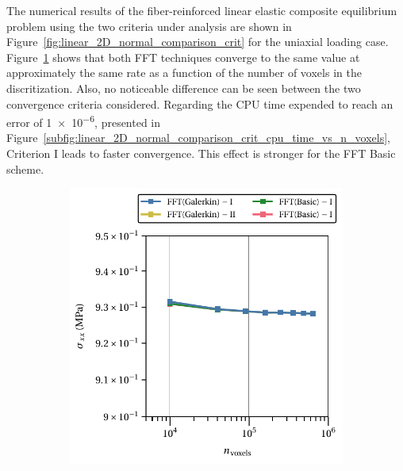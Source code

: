 The numerical results of the fiber-reinforced linear elastic composite equilibrium problem using the two criteria under analysis are shown in Figure~\ref{fig:linear_2D_normal_comparison_crit} for the uniaxial loading case.
Figure~\ref{subfig:linear_2D_normal_comparison_crit_homo_stress_11_vs_n_voxels} shows that both FFT techniques converge to the same value at approximately the same rate as a function of the number of voxels in the discritization.
Also, no noticeable difference can be seen between the two convergence criteria considered.
Regarding the CPU time expended to reach an error of \num{1e-6}, presented in Figure~\ref{subfig:linear_2D_normal_comparison_crit_cpu_time_vs_n_voxels}, Criterion I leads to faster convergence.
This effect is stronger for the FFT Basic scheme.

\begin{figure}[hbt] %
  \centering
	\begin{subfigure}[b]{0.51\textwidth}
    \centering
    \includegraphics[width=\textwidth]{figures/linear_2D_normal_comparison_crit_homo_stress_11_vs_n_voxels}
    \caption{}
    \label{subfig:linear_2D_normal_comparison_crit_homo_stress_11_vs_n_voxels}
  \end{subfigure}
  \begin{subfigure}[b]{0.48\textwidth}

\end{subfigure}
\end{figure}

